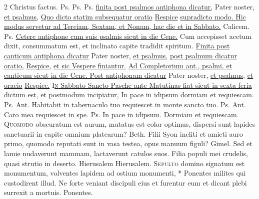 \begin{multicols*}{2}
 Christus factus. {\color{Red} Ps.}  {\color{Red} Ps.}  {\color{Red} Ps.}  \ul{finita post psalmos antiphona dicatur,} Pater noster, \ul{et psalmus,}  \ul{Quo dicto statim subsequatur oratio} \hyperlink{respice-oratio}{Respice} \ul{supradicto modo. Hic modus servetur ad Terciam, Sextam, et Nonam, hac die et in Sabbato.}
 Calicem. {\color{Red} Ps.}  \ul{Cetere antiphone cum suis psalmis sicut in die Cene.}
 Cum accepisset acetum dixit, consummatum est, et inclinato capite tradidit spiritum.
\newline \ul{Finita post canticum antiphona dicatur} Pater noster, \ul{et psalmus,}  \ul{post psalmum dicatur oratio,} \hyperlink{respice-oratio}{Respice,} \ul{et sic Vespere finiantur.}
\newline \ul{Ad Completorium ant., psalmi, et canticum sicut in die Cene. Post antiphonam dicatur} Pater noster, \ul{et psalmus,}  \ul{et oracio} \hyperlink{respice-oratio}{Respice.}
{\color{Red} }
\lettrine[lines=2]{\zallmancaps \color{Red} I}{}\ul{\textsc{n} Sabbato Sancto Pasche ante Matutinas fiat sicut in sexta feria dictum est, et postmodum incipiatur,}
 In pace in idipsum dormiam et requiescam. {\color{Red} Ps.}  {\color{Red} Ant.} Habitabit in tabernaculo tuo requiescet in monte sancto tuo. {\color{Red} Ps.}  {\color{Red} Ant.} Caro mea requiescet in spe. {\color{Red} Ps.}  \V In pace in idipsum. \R Dormiam et requiescam.
\lettrine[lines=2]{\zallmancaps \color{Blue} Q}{uomodo} obscuratum est aurum, mutatus est color optimus, dispersi sunt lapides sanctuarii in capite omnium platearum? {\color{Red} Beth.} Filii Syon incliti et amicti auro primo, quomodo reputati sunt in vasa testea, opus manuum figuli? {\color{Red} Gimel.} Sed et lamie nudaverunt mammam, lactaverunt catulos suos. Filia populi mei crudelis, quasi strutio in deserto. Hierusalem Hierusalem. \R
\lettrine[lines=2]{\zallmancaps \color{Red} S}{epulto} \hypertarget{sepulto-domino}{\label{sepulto-domino}} domino signatum est monumentum, volventes lapidem ad ostium monumenti, * Ponentes milites qui custodirent illud. \V Ne forte veniant discipuli eius et furentur eum et dicant plebi surrexit a mortuis. Ponentes.

\end{multicols*}
